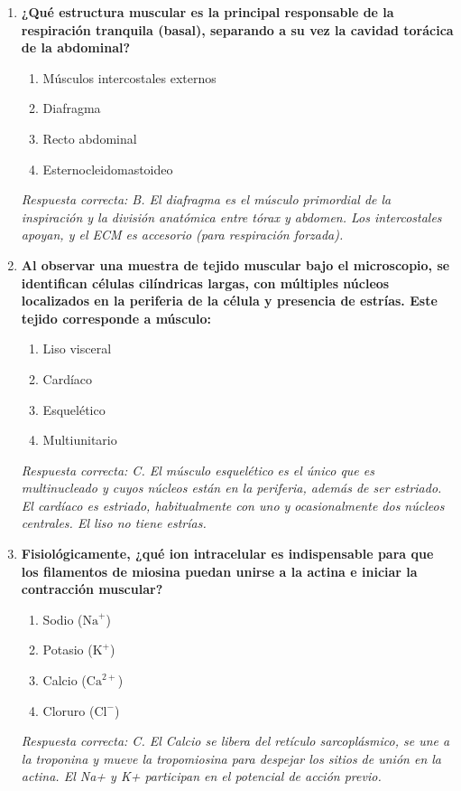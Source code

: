 \begin{enumerate}[label=\textbf{\arabic*.}]
    \item \textbf{¿Qué estructura muscular es la principal responsable de la respiración tranquila (basal), separando a su vez la cavidad torácica de la abdominal?}
    \begin{enumerate}
        \item[A)] Músculos intercostales externos
        \item[B)] Diafragma
        \item[C)] Recto abdominal
        \item[D)] Esternocleidomastoideo
    \end{enumerate}
    \textit{Respuesta correcta: B. El diafragma es el músculo primordial de la inspiración y la división anatómica entre tórax y abdomen. Los intercostales apoyan, y el ECM es accesorio (para respiración forzada).}

    \item \textbf{Al observar una muestra de tejido muscular bajo el microscopio, se identifican células cilíndricas largas, con múltiples núcleos localizados en la periferia de la célula y presencia de estrías. Este tejido corresponde a músculo:}
    \begin{enumerate}
        \item[A)] Liso visceral
        \item[B)] Cardíaco
        \item[C)] Esquelético
        \item[D)] Multiunitario
    \end{enumerate}
    \textit{Respuesta correcta: C. El músculo esquelético es el único que es multinucleado y cuyos núcleos están en la periferia, además de ser estriado. El cardíaco es estriado, habitualmente con uno y ocasionalmente dos núcleos centrales. El liso no tiene estrías.}

    \item \textbf{Fisiológicamente, ¿qué ion intracelular es indispensable para que los filamentos de miosina puedan unirse a la actina e iniciar la contracción muscular?}
    \begin{enumerate}
        \item[A)] Sodio ($\mathrm{Na}^{+}$)
        \item[B)] Potasio ($\mathrm{K}^{+}$)
        \item[C)] Calcio ($\mathrm{Ca}^{2+}$)
        \item[D)] Cloruro ($\mathrm{Cl}^{-}$)
    \end{enumerate}
    \textit{Respuesta correcta: C. El Calcio se libera del retículo sarcoplásmico, se une a la troponina y mueve la tropomiosina para despejar los sitios de unión en la actina. El Na+ y K+ participan en el potencial de acción previo.}


\end{enumerate}
